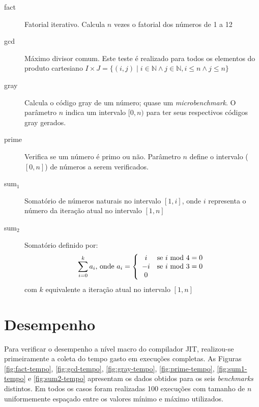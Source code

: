 \begin{description}
\item[fact] Fatorial iterativo. Calcula $n$ vezes o fatorial dos
  números de 1 a 12
\item[gcd] Máximo divisor comum. Este teste é realizado
  para todos os elementos do produto cartesiano
 $I \times J = \{(i, j) \mid i \in \mathbb{N} \wedge j \in \mathbb{N},
 i \le n \wedge j \le n\}$
\item[gray] Calcula o código gray \cite{graycode} de um número;
  quase um \textit{microbenchmark}. O parâmetro $n$ indica um
  intervalo $[0, n)$ para ter seus respectivos códigos gray gerados.
\item[prime] Verifica se um número é primo ou não. Parâmetro $n$
  define o intervalo ($[0, n]$) de números a serem verificados.
\item[sum$_1$] Somatório de números naturais no intervalo
 $[1, i]$, onde $i$ representa o número da iteração atual no intervalo
 $[1, n]$
\item[sum$_2$] Somatório definido por:
\[ \sum_{i=0}^k a_i\mbox{, onde } a_i = \left\{
    \begin{array}{c l}
      i & \mbox{se } i \mbox{ mod } 4 = 0 \\
      -i & \mbox{se } i \mbox{ mod } 3 = 0 \\
      0
    \end{array}
  \right.
\] com $k$ equivalente a iteração atual no intervalo $[1, n]$
\end{description}


\section{Desempenho}

Para verificar o desempenho a nível macro do compilador JIT,
realizou-se primeiramente a coleta do tempo gasto em execuções
completas. As Figuras
\ref{fig:fact-tempo}, \ref{fig:gcd-tempo}, \ref{fig:gray-tempo},
\ref{fig:prime-tempo}, \ref{fig:sum1-tempo} e \ref{fig:sum2-tempo}
apresentam os dados obtidos para os seis \textit{benchmarks}
distintos. Em todos os casos foram realizadas 100 execuções com tamanho de
$n$ uniformemente espaçado entre os valores mínimo e máximo utilizados.

